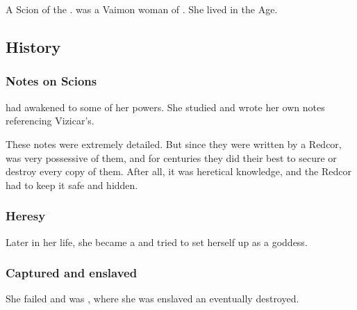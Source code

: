 \section{\Iolivine}
\index{\Iolivine}
A Scion of the  . 
\Iolivine{} was a Vaimon woman of \ClanRedcor. 
She lived in the \Ortaican{} Age. 









\subsection{History}





\subsubsection{Notes on Scions}
\Iolivine{} had awakened to some of her powers. 
She studied  and wrote her own notes referencing Vizicar's. 

These notes were extremely detailed. 
But since they were written by a Redcor, \ClanRedcor was very possessive of them, and for centuries they did their best to secure or destroy every copy of them. 
After all, it was heretical knowledge, and the Redcor had to keep it safe and hidden. 





\subsubsection{Heresy}
Later in her life, she became a  and tried to set herself up as a goddess. 





\subsubsection{Captured and enslaved}
She failed and was , where she was enslaved an eventually destroyed. 


















